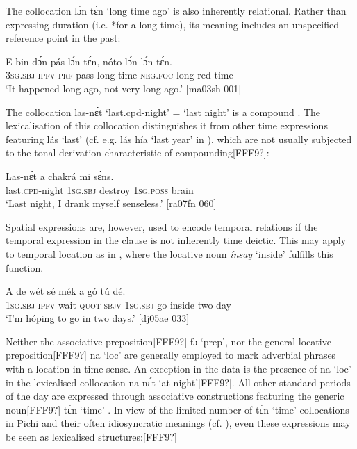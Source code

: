 The collocation lɔ́n tɛ́n ‘long time ago’ is also inherently relational. Rather than expressing duration (i.e. *for a long time), its meaning includes an unspecified reference point in the past:



\ea%
    \label{ex:key:1017}
    \gll E    bin  dɔ́n  pás  lɔ́n  tɛ́n,    nóto  lɔ́n    lɔ́n  tɛ́n.\\
\textsc{3sg.sbj}  \textsc{ipfv}  \textsc{prf}  pass  long  time    \textsc{neg}.\textsc{foc}  long    red  time\\

\glt ‘It happened long ago, not very long ago.’ [ma03sh 001]
\z

The collocation las-nɛ́t ‘last.cpd-night’ = ‘last night’ is a compound . The lexicalisation of this collocation distinguishes it from other time expressions featuring lás ‘last’ (cf. e.g. lás hía ‘last year’ in ), which are not usually subjected to the tonal derivation characteristic of compounding[FFF9?]: 


\ea%
    \label{ex:key:1018}
    \gll Las-nɛ́t    a    chakrá  mi    sɛ́ns.\\
last.\textsc{cpd}{}-night  \textsc{1sg.sbj}  destroy  \textsc{1sg.poss}  brain\\

\glt ‘Last night, I drank myself senseless.’ [ra07fn 060]
\z

Spatial expressions are, however, used to encode temporal relations if the temporal expression in the clause is not inherently time deictic. This may apply to temporal location as in , where the locative noun\index{}\textit{ ínsay} ‘inside’ fulfills this function. 


\ea%
    \label{ex:key:1019}
    \gll A    de  wét  sé    mék  a    gó    tú  dé.\\
\textsc{1sg.sbj}  \textsc{ipfv}  wait  \textsc{quot}    \textsc{sbjv}  \textsc{1sg.sbj}  go  inside  two  day\\

\glt ‘I’m hóping to go in two days.’ [dj05ae 033]
\z

Neither the associative preposition[FFF9?] fɔ ‘prep’, nor the general locative preposition[FFF9?] na ‘loc’ are generally employed to mark adverbial phrases with a location-in-time sense. An exception in the data is the presence of na ‘loc’ in the lexicalised collocation na nɛ́t ‘at night’[FFF9?]. All other standard periods of the day are expressed through associative constructions featuring the generic noun[FFF9?] tɛ́n ‘time’ . In view of the limited number of tɛ́n ‘time’ collocations in Pichi and their often idiosyncratic meanings (cf. ), even these expressions may be seen as lexicalised structures:[FFF9?]


